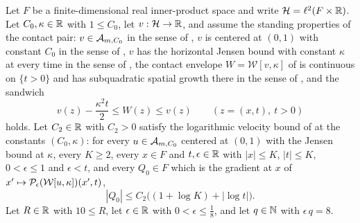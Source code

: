 \begin{lemma}
Let $F$ be a finite-dimensional real inner-product space and write
$\mathcal H=\ell^2(F\times\mathbb{R})$. Let $C_0,\kappa\in\mathbb{R}$ with $1\le C_0$, let
$v:\mathcal H\to\mathbb{R}$, and assume the standing properties of the contact pair:
$v\in\mathcal{A}_{m,C_0}$ in the sense of , $v$ is centered at
$(0,1)$ with constant $C_0$ in the sense of , $v$ has the
horizontal Jensen bound with constant $\kappa$ at every time in the sense of
, the contact envelope $W=\mathcal W[v,\kappa]$ of
 is continuous on $\{t>0\}$ and has subquadratic spatial
growth there in the sense of , and the sandwich
\[
  v(z)-\frac{\kappa^2t}{2}\le W(z)\le v(z)\qquad(z=(x,t),\ t>0)
\]
holds. Let $C_2\in\mathbb{R}$ with $C_2>0$ satisfy the logarithmic velocity bound of
 at the constants $(C_0,\kappa)$: for every
$u\in\mathcal{A}_{m,C_0}$ centered at $(0,1)$ with the Jensen bound at $\kappa$,
every $K\ge2$, every $x\in F$ and $t,\epsilon\in\mathbb{R}$ with $|x|\le K$,
$|t|\le K$, $0<\epsilon\le1$ and $\epsilon<t$, and every $Q_0\in F$ which is
the gradient at $x$ of $x'\mapsto\mathcal{P}_\epsilon(\mathcal W[u,\kappa])(x',t)$,
\[
  |Q_0|\le C_2\bigl((1+\log K)+|\log t|\bigr).
\]
Let $R\in\mathbb{R}$ with $10\le R$, let $\epsilon\in\mathbb{R}$ with $0<\epsilon\le\tfrac18$,
and let $q\in\mathbb{N}$ with $\epsilon\,q=8$.


\end{lemma}
